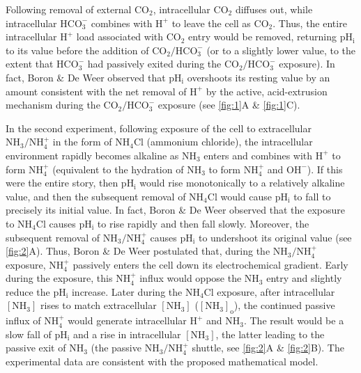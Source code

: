 \documentclass[fleqn,10pt]{physiome}
\begin{document}
Following removal of external $\mathrm{CO_2}$, intracellular $\mathrm{CO_2}$ diffuses out, while intracellular $\mathrm{HCO_3^-}$ combines with $\mathrm{H^+}$ to leave the cell as $\mathrm{CO_2}$. Thus, the entire intracellular $\mathrm{H^+}$ load associated with $\mathrm{CO_2}$ entry would be removed, returning $\mathrm{pH_i}$ to its value before the addition of $\mathrm{CO_2}/\mathrm{HCO_3^-}$ (or to a slightly lower value, to the extent that $\mathrm{HCO_3^-}$ had passively exited during the $\mathrm{CO_2}/\mathrm{HCO_3^-}$ exposure). In fact, Boron \& De Weer observed that $\mathrm{pH_i}$ overshoots its resting value by an amount consistent with the net removal of $\mathrm{H^+}$ by the active, acid-extrusion mechanism during the $\mathrm{CO_2}/\mathrm{HCO_3^-}$ exposure (see \autoref{fig:1}A \& \autoref{fig:1}C).

In the second experiment, following exposure of the cell to extracellular $\mathrm{NH_3}/\mathrm{NH_4^+}$ in the form of $\mathrm{NH_4Cl}$ (ammonium chloride), the intracellular environment rapidly becomes alkaline as $\mathrm{NH_3}$ enters and combines with $\mathrm{H^+}$ to form $\mathrm{NH_4^+}$ (equivalent to the hydration of $\mathrm{NH_3}$ to form $\mathrm{NH_4^+}$ and $\mathrm{OH^-}$). If this were the entire story, then $\mathrm{pH_i}$ would rise monotonically to a relatively alkaline value, and then the subsequent removal of $\mathrm{NH_4Cl}$ would cause $\mathrm{pH_i}$ to fall to precisely its initial value. In fact, Boron \& De Weer observed that the exposure to $\mathrm{NH_4Cl}$ causes $\mathrm{pH_i}$ to rise rapidly and then fall slowly. Moreover, the subsequent removal of $\mathrm{NH_3}/\mathrm{NH_4^+}$ causes $\mathrm{pH_i}$ to undershoot its original value (see \autoref{fig:2}A). Thus, Boron \& De Weer postulated that, during the $\mathrm{NH_3}/\mathrm{NH_4^+}$ exposure, $\mathrm{NH_4^+}$ passively enters the cell down its electrochemical gradient. Early during the exposure, this $\mathrm{NH_4^+}$ influx would oppose the $\mathrm{NH_3}$ entry and slightly reduce the $\mathrm{pH_i}$ increase. Later during the $\mathrm{NH_4Cl}$ exposure, after intracellular $\mathrm{[NH_3]}$ rises to match extracellular $\mathrm{[NH_3]}$ ($\mathrm{[NH_3]_o}$), the continued passive influx of $\mathrm{NH_4^+}$ would generate intracellular $\mathrm{H^+}$ and $\mathrm{NH_3}$. The result would be a slow fall of $\mathrm{pH_i}$ and a rise in intracellular $\mathrm{[NH_3]}$, the latter leading to the passive exit of $\mathrm{NH_3}$ (the passive $\mathrm{NH_3}/\mathrm{NH_4^+}$ shuttle, see \autoref{fig:2}A \& \autoref{fig:2}B). The experimental data are consistent with the proposed mathematical model.
\end{document}
